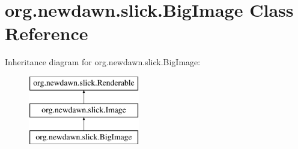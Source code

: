 \hypertarget{classorg_1_1newdawn_1_1slick_1_1_big_image}{}\section{org.\+newdawn.\+slick.\+Big\+Image Class Reference}
\label{classorg_1_1newdawn_1_1slick_1_1_big_image}
Inheritance diagram for org.\+newdawn.\+slick.\+Big\+Image\+:\begin{figure}[H]
\begin{center}
\leavevmode
\includegraphics[height=3.000000cm]{classorg_1_1newdawn_1_1slick_1_1_big_image}
\end{center}
\end{figure}
